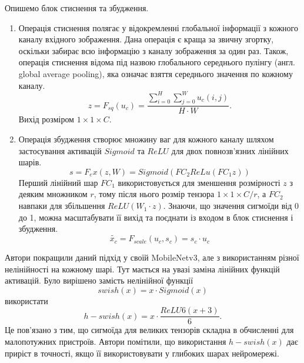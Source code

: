 Опишемо блок стиснення та збудження.
\begin{enumerate}
    \item Операція стиснення полягає у відокремленні глобальної інформації з кожного каналу
          вхідного зображення. Дана операція є краща за звичну згортку, оскільки забирає всю інформацію
          з каналу зображення за один раз. Також, операція стиснення відома під назвою глобального
          середнього пулінгу  (англ. global average pooling), яка означає взяття середнього значення
          по кожному каналу.
          \begin{equation*}
              z = F_{sq}(u_c) = \frac{\sum_{i=0}^{H} \sum_{j=0}^{W} u_c(i,j)}{H\cdot W}.
          \end{equation*}
          Вихід розміром $1 \times 1 \times C$.
    \item Операція збудження створює множину ваг для кожного каналу шляхом застосування
          активацій $Sigmoid$ та $ReLU$ для двох повнозв'язних лінійних шарів.
          \begin{equation*}
              s = F_ex(z,W) = Sigmoid(FC_2ReLu(FC_1z))
          \end{equation*}
          Перший лінійний шар $FC_1$ використовується для зменшення розмірності $z$ з деяким
          множником $r$, тому після нього розмір тензора $1 \times 1 \times C/r$, а $FC_2$ навпаки
          для збільшення $ReLU(W_1 \cdot  z)$. Знаючи, що значення сигмоїди від 0 до 1, можна
          масштабувати її вихід та поєднати із входом в блок стиснення і збудження.
          \begin{equation*}
              \widetilde{x_c} = F_{scale}(u_c,s_c) = s_c\cdot u_c
          \end{equation*}
\end{enumerate}

Автори покращили даний підхід у своїй MobileNetv3, але з використанням
різної нелінійності на кожному шарі. Тут мається на увазі заміна лінійних функцій активацій.
Було вирішено замість нелінійної функції
\begin{equation*}
    swish(x) = x\cdot Sigmoid(x)
\end{equation*}
використати
\begin{equation*}
    h-swish(x) = x\cdot \frac{ReLU6(x + 3)}{6}.
\end{equation*}
Це пов'язано з тим, що сигмоїда для великих тензорів складна в обчисленні
для малопотужних пристроїв. Автори помітили,
що використання $h-swish(x)$ дає приріст в точності, якщо її
використовувати у глибоких шарах нейромережі.

